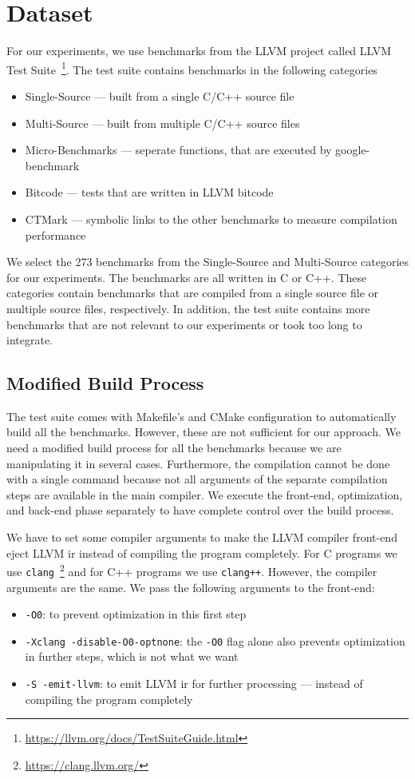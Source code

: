 \section{Dataset}
\label{sec:approach:dataset}
For our experiments, we use benchmarks from the LLVM project called LLVM Test Suite~\footnote{\url{https://llvm.org/docs/TestSuiteGuide.html}}.
The test suite contains benchmarks in the following categories
\begin{itemize}
    \item Single-Source --- built from a single C/C++ source file
    \item Multi-Source --- built from multiple C/C++ source files
    \item Micro-Benchmarks --- seperate functions, that are executed by google-benchmark
    \item Bitcode --- tests that are written in LLVM bitcode
    \item CTMark --- symbolic links to the other benchmarks to measure compilation performance
\end{itemize}
We select the 273 benchmarks from the Single-Source and Multi-Source categories for our experiments.
The benchmarks are all written in C or C++.
These categories contain benchmarks that are compiled from a single source file or multiple source files, respectively.
In addition, the test suite contains more benchmarks that are not relevant to our experiments or took too long to integrate.

\subsection{Modified Build Process}
\label{sec:approach:build_process}
The test suite comes with Makefile's and CMake configuration to automatically build all the benchmarks.
However, these are not sufficient for our approach.
We need a modified build process for all the benchmarks because we are manipulating it in several cases.
Furthermore, the compilation cannot be done with a single command because not all arguments of the separate compilation steps are available in the main compiler.
We execute the front-end, optimization, and back-end phase separately to have complete control over the build process.

We have to set some compiler arguments to make the LLVM compiler front-end eject LLVM \ac{ir} instead of compiling the program completely.
For C programs we use \lstinline{clang}~\footnote{\url{https://clang.llvm.org/}} and for C++ programs we use \lstinline{clang++}.
However, the compiler arguments are the same.
We pass the following arguments to the front-end:
\begin{itemize}
    \item \lstinline{-O0}: to prevent optimization in this first step
    \item \lstinline{-Xclang -disable-O0-optnone}: the \lstinline{-O0} flag alone also prevents optimization in further steps, which is not what we want
    \item \lstinline{-S -emit-llvm}: to emit LLVM \ac{ir} for further processing --- instead of compiling the program completely
\end{itemize}

